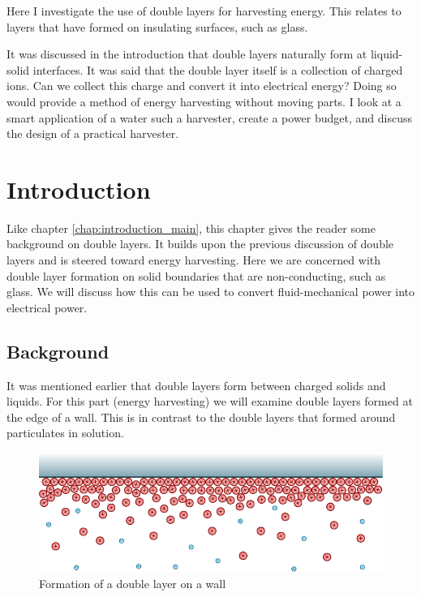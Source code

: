 
Here I investigate the use of double layers for harvesting energy.
This relates to layers that have formed on insulating surfaces, such as glass.

It was discussed in the introduction that double layers naturally form at liquid-solid interfaces.
It was said that the double layer itself is a collection of charged ions.
Can we collect this charge and convert it into electrical energy?
Doing so would provide a method of energy harvesting without moving parts.
I look at a smart application of a water such a harvester, create a power budget, and discuss the design of a practical harvester.

\chapter{Introduction}
  \label{chap:harvesterIntroduction}
  Like chapter \ref{chap:introduction_main}, this chapter gives the reader some background on double layers.
  It builds upon the previous discussion of double layers and is steered toward energy harvesting.
  Here we are concerned with double layer formation on solid boundaries that are non-conducting, such as glass.
  We will discuss how this can be used to convert fluid-mechanical power into electrical power.

  \section{Background}
    It was mentioned earlier that double layers form between charged solids and liquids.
    For this part (energy harvesting) we will examine double layers formed at the edge of a wall.
    This is in contrast to the double layers that formed around particulates in solution.

    \begin{figure}
        \centering
        \includegraphics{content/pt1/01-PowerHarvesting/graphics/doubleLayerOnWall}
        \caption{\label{fig:doubleLayerOnWall}Formation of a double layer on a wall}
    \end{figure}

